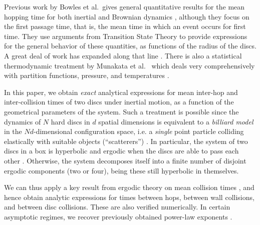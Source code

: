 \documentclass[superscriptaddress,pre,reprint,showpacs,onecolumn]{revtex4-1}
\newcommand{\etal}{et al.\ }
\begin{document}
Previous work
by Bowles \etal gives general quantitative results for the mean hopping 
time for both inertial and Brownian dynamics \cite{Bowles04}, although they focus
on the first passage time, that is, the mean time in which an event
occurs for first time. 
They use arguments from Transition State Theory 
to provide expressions for the general behavior of these quantities, as functions of the
radius of the discs. %
A great deal of work has expanded along that line  \cite{Suh05, Ball09}.
There is also a statistical thermodynamic treatment by Munakata \etal 
which deals very comprehensively with partition functions, pressure,
and temperatures \cite{Munakata02, Munakata06}. 


In this paper, we obtain \emph{exact} analytical expressions for mean inter-hop and inter-collision times of two discs under 
inertial motion, as a function of the geometrical parameters of the system. Such a treatment is possible
 since the dynamics of $N$ hard discs in $d$ spatial dimensions
 is equivalent to a \emph{billiard model} in the $Nd$-dimensional configuration space, i.e. a \emph{single} point particle colliding elastically 
with suitable objects (``scatterers'') \cite{SzaszBook00}. 
In particular, the system of two discs in a box is hyperbolic and ergodic when the discs are able to pass each other \cite{Sim99}. Otherwise, the system decomposes itself into
a finite number of disjoint ergodic components (two or four), being these still hyperbolic in themselves.

We can thus apply a key result from ergodic theory on mean collision times \cite{Chernov97}, and hence obtain analytic expressions 
for times between hops, between wall collisions, and between disc collisions. These are also verified numerically. 
In certain asymptotic regimes, we recover previously obtained power-law exponents \cite{Bowles04}.


\end{document}

